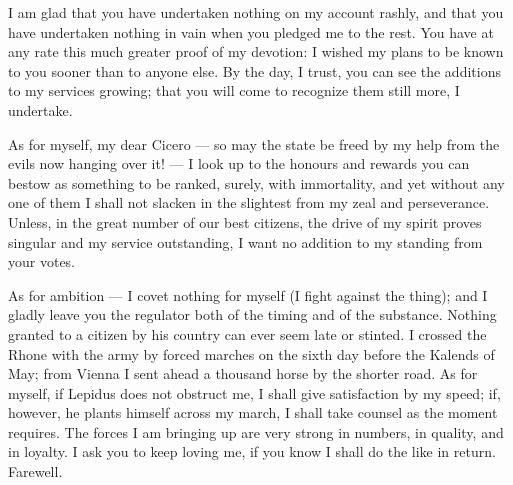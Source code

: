 

 I am glad that you have undertaken nothing on my account rashly, and that you have undertaken nothing in vain when you pledged me to the rest. You have at any rate this much greater proof of my devotion: I wished my plans to be known to you sooner than to anyone else. By the day, I trust, you can see the additions to my services growing; that you will come to recognize them still more, I undertake.

 As for myself, my dear Cicero --- so may the state be freed by my help from the evils now hanging over it! --- I look up to the honours and rewards you can bestow as something to be ranked, surely, with immortality, and yet without any one of them I shall not slacken in the slightest from my zeal and perseverance. Unless, in the great number of our best citizens, the drive of my spirit proves singular and my service outstanding, I want no addition to my standing from your votes.

 As for ambition --- I covet nothing for myself (I fight against the thing); and I gladly leave you the regulator both of the timing and of the substance. Nothing granted to a citizen by his country can ever seem late or stinted. I crossed the Rhone with the army by forced marches on the sixth day before the Kalends of May; from Vienna I sent ahead a thousand horse by the shorter road. As for myself, if Lepidus does not obstruct me, I shall give satisfaction by my speed; if, however, he plants himself across my march, I shall take counsel as the moment requires. The forces I am bringing up are very strong in numbers, in quality, and in loyalty. I ask you to keep loving me, if you know I shall do the like in return. Farewell.
